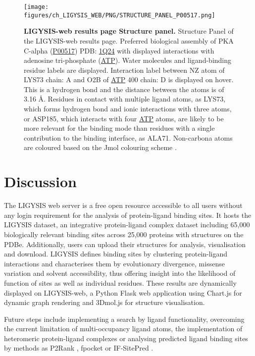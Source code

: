 \begin{figure}[htb!]
    \centering
    \texttt{[image: figures/ch\_LIGYSIS\_WEB/PNG/STRUCTURE\_PANEL\_P00517.png]}
    \caption[LIGYSIS-web results page Structure Panel]{\textbf{LIGYSIS-web results page Structure panel.} Structure Panel of the LIGYSIS-web results page. Preferred biological assembly of PKA C-alpha (\href{https://www.uniprot.org/uniprotkb/P00517/entry}{P00517}) PDB: \href{https://www.ebi.ac.uk/pdbe/entry/pdb/1Q24}{1Q24} \cite{GAEL_2003_AKT} with displayed interactions with adenosine tri-phosphate (\href{https://www.ebi.ac.uk/pdbe-srv/pdbechem/chemicalCompound/show/ATP}{ATP}). Water molecules and ligand-binding residue labels are displayed. Interaction label between NZ atom of LYS73 chain: A and O2B of \href{https://www.ebi.ac.uk/pdbe-srv/pdbechem/chemicalCompound/show/ATP}{ATP} 400 chain: D is displayed on hover. This is a hydrogen bond and the distance between the atoms is of 3.16 \AA{}. Residues in contact with multiple ligand atoms, as LYS73, which forms hydrogen bond and ionic interactions with three atoms, or ASP185, which interacts with four \href{https://www.ebi.ac.uk/pdbe-srv/pdbechem/chemicalCompound/show/ATP}{ATP} atoms, are likely to be more relevant for the binding mode than residues with a single contribution to the binding interface, as ALA71. Non-carbona atoms are coloured based on the Jmol colouring scheme \cite{JMOL}.}
    \label{fig:LIGYSIS_web_STRUCTURE_PANEL}
\end{figure}


\section{Discussion}

The LIGYSIS web server is a free open resource accessible to all users without any login requirement for the analysis of protein-ligand binding sites. It hosts the LIGYSIS dataset, an integrative protein-ligand complex dataset including 65,000 biologically relevant binding sites across 25,000 proteins with structures on the PDBe. Additionally, users can upload their structures for analysis, visualisation and download. LIGYSIS defines binding sites by clustering protein-ligand interactions and characterises them by evolutionary divergence, missense variation and solvent accessibility, thus offering insight into the likelihood of function of sites as well as individual residues. These results are dynamically displayed on LIGYSIS-web, a Python Flask web application using Chart.js for dynamic graph rendering and 3Dmol.js for structure visualisation.

Future steps include implementing a search by ligand functionality, overcoming the current limitation of multi-occupancy ligand atoms, the implementation of heteromeric protein-ligand complexes or analysing predicted ligand binding sites by methods as P2Rank \cite{KRIVAK_2015_PRANK, KRIVAK_2015_P2RANK, KRIVAK_2018_P2RANK, JENDELE_2019_PRANKWEB, JAKUBEC_2022_PRANKWEB}, fpocket \cite{GUILLOUX_2009_FPOCKET, SCHMIDTKE_2010_FPOCKET2} or IF-SitePred \cite{CARBERY_2024_IFSP}.
